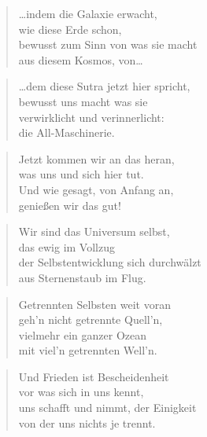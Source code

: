 \documentclass[10pt,a4paper]{article}
\begin{document}
\begin{paracol}{2}
\begin{verse}
…indem die Galaxie erwacht, \\
wie diese Erde schon, \\
bewusst zum Sinn von was sie macht \\
aus diesem Kosmos, von… \\
\end{verse}

\begin{verse}
…dem diese Sutra jetzt hier spricht, \\
bewusst uns macht was sie \\
verwirklicht und verinnerlicht: \\
die All-Maschinerie. \\
\end{verse}

\begin{verse}
Jetzt kommen wir an das heran, \\
was uns und sich hier tut. \\
Und wie gesagt, von Anfang an, \\
genießen wir das gut! \\
\end{verse}

\begin{verse}
Wir sind das Universum selbst, \\
das ewig im Vollzug \\
der Selbstentwicklung sich durchwälzt \\
aus Sternenstaub im Flug. \\
\end{verse}

\begin{verse}
Getrennten Selbsten weit voran \\
geh’n nicht getrennte Quell’n, \\
vielmehr ein ganzer Ozean \\
mit viel’n getrennten Well’n. \\
\end{verse}

\begin{verse}
Und Frieden ist Bescheidenheit \\
vor was sich in uns kennt, \\
uns schafft und nimmt, der Einigkeit \\
von der uns nichts je trennt. \\
\end{verse}


\end{paracol}
\end{document}

